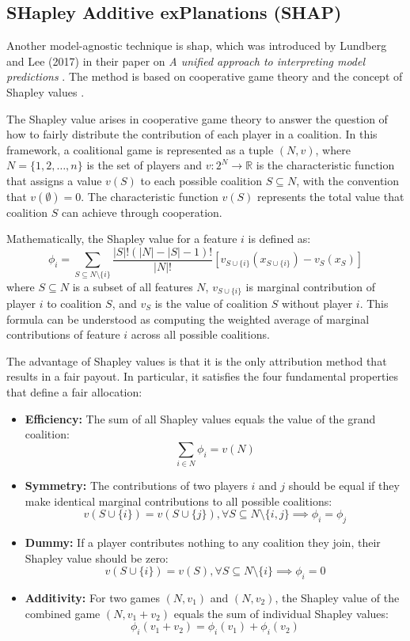 \subsection{SHapley Additive exPlanations (SHAP)} \label{sec:shap}

Another model-agnostic technique is \acrfull{shap}, which was introduced by Lundberg and Lee (2017) in their paper on \textit{A unified approach to interpreting model predictions} \cite{Lundberg2017}. The method is based on cooperative game theory and the concept of Shapley values \cite{Shapley1953}.

The Shapley value arises in cooperative game theory to answer the question of how to fairly distribute the contribution of each player in a coalition. In this framework, a coalitional game is represented as a tuple $(N,v)$, where $N = \{1, 2, \ldots, n\}$ is the set of players and $v: 2^N \rightarrow \mathbb{R}$ is the characteristic function that assigns a value $v(S)$ to each possible coalition $S \subseteq N$, with the convention that $v(\emptyset) = 0$. The characteristic function $v(S)$ represents the total value that coalition $S$ can achieve through cooperation. 

Mathematically, the Shapley value for a feature $i$ is defined as:
\begin{equation}
    \phi_i = \sum_{S \subseteq N \setminus \{i\}} \frac{|S|! (|N| - |S| - 1)!}{|N|!} \left[ v_{S \cup \{i\}}(x_{S \cup \{i\}}) - v_S(x_S) \right]
\end{equation}
where $S \subseteq N$ is a subset of all features $N$, $v_{S \cup \{i\}}$ is marginal contribution of player $i$ to coalition $S$, and $v_S$ is the value of coalition $S$ without player $i$. This formula can be understood as computing the weighted average of marginal contributions of feature $i$ across all possible coalitions. 

The advantage of Shapley values is that it is the only attribution method that results in a fair payout. In particular, it satisfies the four fundamental properties that define a fair allocation: 

\begin{itemize}
    \item \textbf{Efficiency:} The sum of all Shapley values equals the value of the grand coalition:
    \[
        \sum_{i \in N} \phi_i = v(N)
    \]
    \item \textbf{Symmetry:} The contributions of two players $i$ and $j$ should be equal if they make identical marginal contributions to all possible coalitions:
    \[
        v(S \cup \{i\}) = v(S \cup \{j\}), \forall S \subseteq N \setminus \{i, j\} \implies \phi_i = \phi_j
    \]
    \item \textbf{Dummy:} If a player contributes nothing to any coalition they join, their Shapley value should be zero:
    \[
        v(S \cup \{i\}) = v(S), \forall S \subseteq N \setminus \{i\} \implies \phi_i = 0
    \]
    \item \textbf{Additivity:} For two games $(N,v_1)$ and $(N,v_2)$, the Shapley value of the combined game $(N,v_1+v_2)$ equals the sum of individual Shapley values:
    \[
        \phi_i(v_1 + v_2) = \phi_i(v_1) + \phi_i(v_2)
    \]
\end{itemize}

